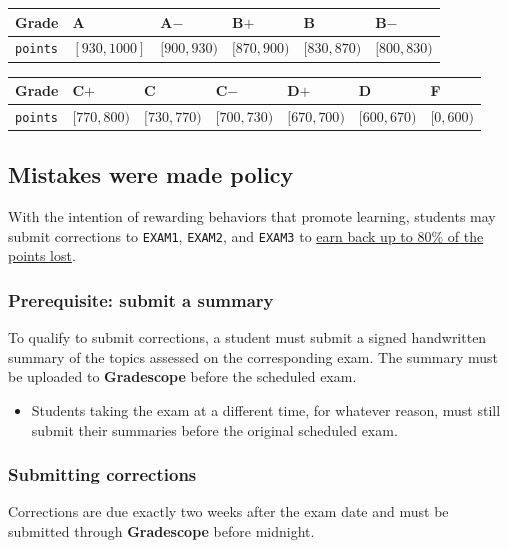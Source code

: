 \documentclass[11pt]{article}
\begin{document}
\begin{center}
\begin{tabular}{l|lllll}
\textbf{Grade} & A & A\(-\) & B\(+\) & B & B\(-\)\\[0pt]
\hline
\texttt{points} & \([930,1000]\) & \([900,930)\) & \([870,900)\) & \([830,870)\) & \([800,830)\)\\[0pt]
\end{tabular}
\end{center}

\begin{center}
\begin{tabular}{l|llllll}
\textbf{Grade} & C\(+\) & C & C\(-\) & D\(+\) & D & F\\[0pt]
\hline
\texttt{points} & \([770,800)\) & \([730,770)\) & \([700,730)\) & \([670,700)\) & \([600,670)\) & \([0,600)\)\\[0pt]
\end{tabular}
\end{center}

\subsection*{Mistakes were made policy}
\label{sec:org3afed50}
With the intention of rewarding behaviors that promote learning, students may
submit corrections to \texttt{EXAM1}, \texttt{EXAM2}, and \texttt{EXAM3} to \uline{earn back up to 80\% of
the points lost}.

\subsubsection*{Prerequisite: submit a summary}
\label{sec:orgc19dafe}
To qualify to submit corrections, a student must submit a signed handwritten
summary of the topics assessed on the corresponding exam. The summary must be
uploaded to \textbf{Gradescope} before the scheduled exam.
\begin{itemize}
\item Students taking the exam at a different time, for whatever reason, must still
submit their summaries before the original scheduled exam.
\end{itemize}

\subsubsection*{Submitting corrections}
\label{sec:org31c1b1b}
Corrections are due exactly two weeks after the exam date and must be submitted
through \textbf{Gradescope} before midnight.
\end{document}
